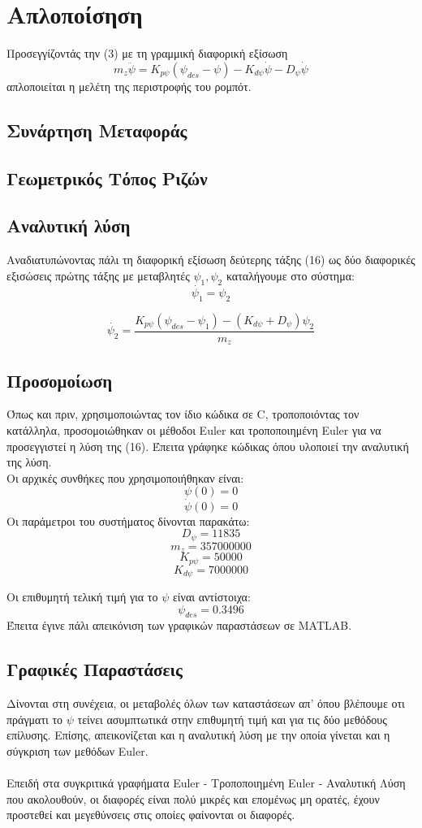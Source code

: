 \documentclass{article}
\begin{document}
\section{Απλοποίσηση}
Προσεγγίζοντάς την (3) με τη γραμμική διαφορική εξίσωση 
\begin{equation}
m_z\ddot{\psi} = K_{p\psi}(\psi_{des} - \psi) - K_{d\psi}\dot{\psi} - D_\psi\dot{\psi}
\end{equation}
απλοποιείται η μελέτη της περιστροφής του ρομπότ.
\subsection{Συνάρτηση Μεταφοράς}
\subsection{Γεωμετρικός Τόπος Ριζών}
\subsection{Αναλυτική λύση}
Αναδιατυπώνοντας πάλι τη διαφορική εξίσωση δεύτερης τάξης (16) ως δύο διαφορικές εξισώσεις πρώτης τάξης με μεταβλητές \(\psi_1, \psi_2\) καταλήγουμε στο σύστημα:
\begin{equation}
\dot{\psi_1} = \psi_2
\end{equation}

\begin{equation}
\dot{\psi_2} = \frac{K_{p\psi}(\psi_{des} - \psi_1) - (K_{d\psi} + D_\psi)\psi_2}{m_z}
\end{equation}
\subsection{Προσομοίωση}
Όπως και πριν, χρησιμοποιώντας τον ίδιο κώδικα σε C, τροποποιόντας τον κατάλληλα, προσομοιώθηκαν οι μέθοδοι Euler και τροποποιημένη Euler για να προσεγγιστεί η λύση της (16). Έπειτα γράφηκε κώδικας όπου υλοποιεί την αναλυτική της λύση.   
\\Oι αρχικές συνθήκες που χρησιμοποιήθηκαν είναι:
\[\psi(0) = 0\]
\[\dot{\psi}(0) = 0\]
Οι παράμετροι του συστήματος δίνονται παρακάτω:
\[D_\psi = 11835\]
\[m_z = 357000000\]
\[K_{p\psi} = 50000\]
\[K_{d\psi} = 7000000\]

Οι επιθυμητή τελική τιμή για το \(\psi\) είναι αντίστοιχα: 
\[\psi_{des} = 0.3496\]
Έπειτα έγινε πάλι απεικόνιση των γραφικών παραστάσεων σε MATLAB.
\subsection{Γραφικές Παραστάσεις}
Δίνονται στη συνέχεια, οι μεταβολές όλων των καταστάσεων απ' όπου βλέπουμε οτι πράγματι το \(\psi\) τείνει ασυμπτωτικά στην επιθυμητή τιμή και για τις δύο μεθόδους επίλυσης. Επίσης, απεικονίζεται και η αναλυτική λύση με την οποία γίνεται και η σύγκριση των μεθόδων Euler. 
\\\\
Επειδή στα συγκριτικά γραφήματα Euler - Tροποποιημένη Euler - Αναλυτική Λύση που ακολουθούν, οι διαφορές είναι πολύ μικρές και επομένως μη ορατές, έχουν προστεθεί και μεγεθύνσεις στις οποίες φαίνονται οι διαφορές.
\end{document}
